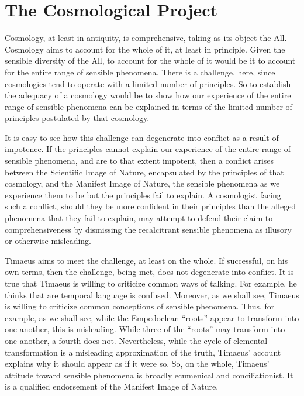 
\section{The Cosmological Project} %
\label{sec:the_cosmological_project}

Cosmology, at least in antiquity, is comprehensive, taking as its object the All. Cosmology aims to account for the whole of it, at least in principle. Given the sensible diversity of the All, to account for the whole of it would be it to account for the entire range of sensible phenomena. There is a challenge, here, since cosmologies tend to operate with a limited number of principles. So to establish the adequacy of a cosmology would be to show how our experience of the entire range of sensible phenomena can be explained in terms of the limited number of principles postulated by that cosmology.

It is easy to see how this challenge can degenerate into conflict as a result of impotence. If the principles cannot explain our experience of the entire range of sensible phenomena, and are to that extent impotent, then a conflict arises between the Scientific Image of Nature, encapsulated by the principles of that cosmology, and the Manifest Image of Nature, the sensible phenomena as we experience them to be but the principles fail to explain. A cosmologist facing such a conflict, should they be more confident in their principles than the alleged phenomena that they fail to explain, may attempt to defend their claim to comprehensiveness by dismissing the recalcitrant sensible phenomena as illusory or otherwise misleading.

Timaeus aims to meet the challenge, at least on the whole. If successful, on his own terms, then the challenge, being met, does not degenerate into conflict. It is true that Timaeus is willing to criticize common ways of talking. For example, he thinks that are temporal language is confused. Moreover, as we shall see, Timaeus is willing to criticize common conceptions of sensible phenomena. Thus, for example, as we shall see, while the Empedoclean ``roots'' appear to transform into one another, this is misleading. While three of the ``roots'' may transform into one another, a fourth does not. Nevertheless, while the cycle of elemental transformation is a misleading approximation of the truth, Timaeus' account explains why it should appear as if it were so. So, on the whole, Timaeus' attitude toward sensible phenomena is broadly ecumenical and conciliationist. It is a qualified endorsement of the Manifest Image of Nature.

